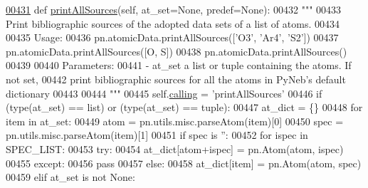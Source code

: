 \begin{DoxyCode}
\hypertarget{classpyneb_1_1utils_1_1manage__atomic__data_1_1___manage_atomic_data_l00431}{}\hyperlink{classpyneb_1_1utils_1_1manage__atomic__data_1_1___manage_atomic_data_a17f7d0a39484aa363bd2814ffbee2855}{00431}     \textcolor{keyword}{def }\hyperlink{classpyneb_1_1utils_1_1manage__atomic__data_1_1___manage_atomic_data_a17f7d0a39484aa363bd2814ffbee2855}{printAllSources}(self, at\_set=None, predef=None):
00432         \textcolor{stringliteral}{"""}
00433 \textcolor{stringliteral}{        Print bibliographic sources of the adopted data sets of a list of atoms.}
00434 \textcolor{stringliteral}{        }
00435 \textcolor{stringliteral}{        Usage:}
00436 \textcolor{stringliteral}{        pn.atomicData.printAllSources(['O3', 'Ar4', 'S2'])}
00437 \textcolor{stringliteral}{        pn.atomicData.printAllSources([O, S])}
00438 \textcolor{stringliteral}{        pn.atomicData.printAllSources()}
00439 \textcolor{stringliteral}{}
00440 \textcolor{stringliteral}{        Parameters: }
00441 \textcolor{stringliteral}{            - at\_set   a list or tuple containing the atoms. If not set, }
00442 \textcolor{stringliteral}{                       print bibliographic sources for all the atoms in PyNeb's default dictionary}
00443 \textcolor{stringliteral}{                       }
00444 \textcolor{stringliteral}{        """}        
00445         self.\hyperlink{classpyneb_1_1utils_1_1manage__atomic__data_1_1___manage_atomic_data_ab10b91ca784741ce7af163d010802434}{calling} = \textcolor{stringliteral}{'printAllSources'}
00446         \textcolor{keywordflow}{if} (type(at\_set) == list) \textcolor{keywordflow}{or} (type(at\_set) == tuple):
00447             at\_dict = \{\}
00448             \textcolor{keywordflow}{for} item \textcolor{keywordflow}{in} at\_set:
00449                 atom = pn.utils.misc.parseAtom(item)[0]
00450                 spec = pn.utils.misc.parseAtom(item)[1]
00451                 \textcolor{keywordflow}{if} spec \textcolor{keywordflow}{is} \textcolor{stringliteral}{''}:
00452                     \textcolor{keywordflow}{for} ispec \textcolor{keywordflow}{in} SPEC\_LIST:
00453                         \textcolor{keywordflow}{try}:
00454                             at\_dict[atom+ispec] = pn.Atom(atom, ispec)
00455                         \textcolor{keywordflow}{except}:
00456                             \textcolor{keywordflow}{pass}
00457                 \textcolor{keywordflow}{else}:
00458                     at\_dict[item] = pn.Atom(atom, spec)
00459         \textcolor{keywordflow}{elif} at\_set \textcolor{keywordflow}{is} \textcolor{keywordflow}{not} \textcolor{keywordtype}{None}:

\end{DoxyCode}

